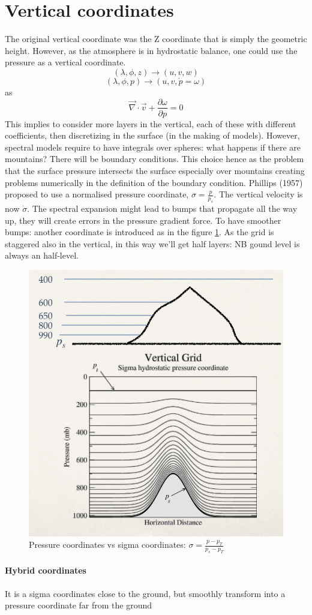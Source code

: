 \section{Vertical coordinates}
The original vertical coordinate was the Z coordinate that is simply the
geometric height. However, as the atmosphere is in hydrostatic balance, one could use the pressure as a vertical coordinate.
$$(\lambda, \phi, z)\rightarrow(u,v,w) $$
$$(\lambda, \phi, p)\rightarrow (u,v,\dot{p}=\omega)$$
as $$\vec{\nabla}\cdot\vec{v}+\frac{\partial\omega}{\partial p}=0$$
This implies to consider more layers in the vertical, each of these with different coefficients, then discretizing in the surface (in the making of models). However, spectral models require to have integrals over spheres: what happens if there are mountains? There will be boundary conditions.
This choice hence as the
problem that the surface pressure intersects the surface especially over
mountains creating problems numerically in the definition of the boundary
condition.
Phillips (1957) proposed to use a normalised pressure coordinate, $\sigma=\frac{p}{p_s}$. The vertical velocity is now $\dot{\sigma}$. The spectral expansion might lead to bumps that propagate all the way up, they will create errors in the pressure gradient force. To have smoother bumps: another coordinate is introduced as in the figure \ref{fig:sigmababy}. As the grid is staggered also in the vertical, in this way we'll get half layers: NB gound level is always an half-level.
\begin{figure}[h!]
	\centering
	\includegraphics[width=0.5\linewidth]{uploads/Screenshot 2024-11-19 143432.png}
	\caption{Pressure coordinates vs sigma coordinates: $\sigma=\frac{p-p_T}{p_s-p_T}$}
	\label{fig:sigmababy}
\end{figure}
\paragraph{Hybrid coordinates}
It is a sigma coordinates close to the ground, but smoothly transform into a
pressure coordinate far from the ground
